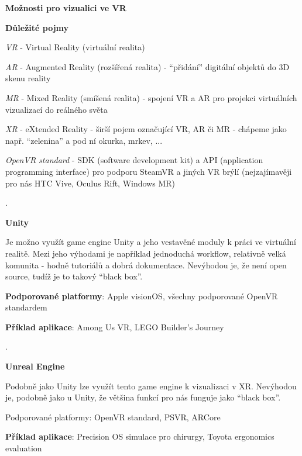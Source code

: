 \documentclass[czech]{article}
\newcounter{variantcounter}
\newenvironment{variant}
{
    \vspace{0pt}
    \ifdim\pagetotal>\dimexpr\textheight-5\baselineskip\relax
        \newpage
    \fi
    \begingroup
    \addtocounter{variantcounter}{1}
    \thevariantcounter{}.
}
{
    \endgroup
}
\begin{document}
\begin{center}
	\textbf{Možnosti pro vizualici ve VR}
\end{center}
\begin{large}
\textbf{Důležité pojmy}

\end{large}

\textit{VR} - Virtual Reality (virtuální realita)

\textit{AR} - Augmented Reality (rozšířená realita) - \enquote{přidání} digitální objektů do 3D skenu reality

\textit{MR} - Mixed Reality (smíšená realita) - spojení VR a AR pro projekci virtuálních vizualizací do reálného světa

\textit{XR} - eXtended Reality - širší pojem označující VR, AR či MR - chápeme jako např. \enquote{zelenina} a pod ní okurka, mrkev, ...

\textit{OpenVR standard} - SDK (software development kit) a API (application programming interface) pro podporu SteamVR a jiných VR brýlí (nejzajímavěji pro nás HTC Vive, Oculus Rift, Windows MR)



\begin{variant}
	\textbf{Unity}
		
	Je možno využít game engine Unity a jeho vestavěné moduly k práci ve virtuální realitě. Mezi jeho výhodami je například jednoduchá workflow, relativně velká komunita - hodně tutoriálů a dobrá dokumentace. Nevýhodou je, že není open source, tudíž je to takový \enquote{black box}.
		
	\textbf{Podporované platformy}: Apple visionOS, všechny podporované OpenVR standardem
	
	\textbf{Příklad aplikace}: Among Us VR, LEGO Builder's Journey
\end{variant}

	
	
\begin{variant}
	\textbf{Unreal Engine}
		
	Podobně jako Unity lze využít tento game engine k vizualizaci v XR. Nevýhodou je, podobně jako u Unity, že většina funkcí pro nás funguje jako \enquote{black box}.
		
	Podporované platformy: OpenVR standard, PSVR, ARCore
		
	\textbf{Příklad aplikace}: Precision OS simulace pro chirurgy, Toyota ergonomics evaluation
\end{variant}
\end{document}
